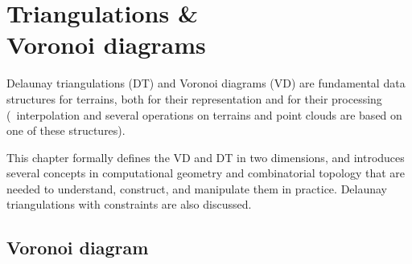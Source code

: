 
\setchapterpreamble[u]{\margintoc}
\graphicspath{{dtvd/}}


\newcommand{\Orient}{O\textsc{rientation}\xspace}
\newcommand{\walk}{W\textsc{alk}\xspace}
\newcommand{\Incircle}{I\textsc{n}C\textsc{ircle}\xspace}

\chapter{Triangulations \& \\Voronoi diagrams}%
\label{chap:dtvd}

Delaunay triangulations (DT) and Voronoi diagrams (VD) are fundamental data structures for terrains, both for their representation and for their processing (\eg\ interpolation and several operations on terrains and point clouds are based on one of these structures).

%

This chapter formally defines the VD and DT in two dimensions, and introduces several concepts in computational geometry and combinatorial topology that are needed to understand, construct, and manipulate them in practice. 
Delaunay triangulations with constraints are also discussed.


\section{Voronoi diagram}


